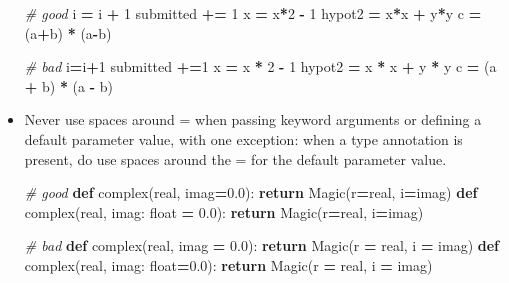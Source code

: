 \documentclass[
]{book}
\newenvironment{Shaded}{\begin{snugshade}}{\end{snugshade}}
\newcommand{\BuiltInTok}[1]{#1}
\newcommand{\CommentTok}[1]{\textcolor[rgb]{0.56,0.35,0.01}{\textit{#1}}}
\newcommand{\ControlFlowTok}[1]{\textcolor[rgb]{0.13,0.29,0.53}{\textbf{#1}}}
\newcommand{\DecValTok}[1]{\textcolor[rgb]{0.00,0.00,0.81}{#1}}
\newcommand{\FloatTok}[1]{\textcolor[rgb]{0.00,0.00,0.81}{#1}}
\newcommand{\KeywordTok}[1]{\textcolor[rgb]{0.13,0.29,0.53}{\textbf{#1}}}
\newcommand{\NormalTok}[1]{#1}
\newcommand{\OperatorTok}[1]{\textcolor[rgb]{0.81,0.36,0.00}{\textbf{#1}}}
\begin{document}
\begin{itemize}
\begin{Shaded}
\begin{Highlighting}[]
\CommentTok{# good}
\NormalTok{i }\OperatorTok{=}\NormalTok{ i }\OperatorTok{+} \DecValTok{1}
\NormalTok{submitted }\OperatorTok{+=} \DecValTok{1}
\NormalTok{x }\OperatorTok{=}\NormalTok{ x}\OperatorTok{*}\DecValTok{2} \OperatorTok{-} \DecValTok{1}
\NormalTok{hypot2 }\OperatorTok{=}\NormalTok{ x}\OperatorTok{*}\NormalTok{x }\OperatorTok{+}\NormalTok{ y}\OperatorTok{*}\NormalTok{y}
\NormalTok{c }\OperatorTok{=}\NormalTok{ (a}\OperatorTok{+}\NormalTok{b) }\OperatorTok{*}\NormalTok{ (a}\OperatorTok{-}\NormalTok{b)}

\CommentTok{# bad}
\NormalTok{i}\OperatorTok{=}\NormalTok{i}\OperatorTok{+}\DecValTok{1}
\NormalTok{submitted }\OperatorTok{+=}\DecValTok{1}
\NormalTok{x }\OperatorTok{=}\NormalTok{ x }\OperatorTok{*} \DecValTok{2} \OperatorTok{-} \DecValTok{1}
\NormalTok{hypot2 }\OperatorTok{=}\NormalTok{ x }\OperatorTok{*}\NormalTok{ x }\OperatorTok{+}\NormalTok{ y }\OperatorTok{*}\NormalTok{ y}
\NormalTok{c }\OperatorTok{=}\NormalTok{ (a }\OperatorTok{+}\NormalTok{ b) }\OperatorTok{*}\NormalTok{ (a }\OperatorTok{-}\NormalTok{ b)}
\end{Highlighting}
\end{Shaded}
\item
  Never use spaces around = when passing keyword arguments or defining a default
  parameter value, with one exception: when a type annotation is present, do
  use spaces around the = for the default parameter value.

\begin{Shaded}
\begin{Highlighting}[]
\CommentTok{# good}
\KeywordTok{def} \BuiltInTok{complex}\NormalTok{(real, imag}\OperatorTok{=}\FloatTok{0.0}\NormalTok{): }\ControlFlowTok{return}\NormalTok{ Magic(r}\OperatorTok{=}\NormalTok{real, i}\OperatorTok{=}\NormalTok{imag)}
\KeywordTok{def} \BuiltInTok{complex}\NormalTok{(real, imag: }\BuiltInTok{float} \OperatorTok{=} \FloatTok{0.0}\NormalTok{): }\ControlFlowTok{return}\NormalTok{ Magic(r}\OperatorTok{=}\NormalTok{real, i}\OperatorTok{=}\NormalTok{imag)}

\CommentTok{# bad}
\KeywordTok{def} \BuiltInTok{complex}\NormalTok{(real, imag }\OperatorTok{=} \FloatTok{0.0}\NormalTok{): }\ControlFlowTok{return}\NormalTok{ Magic(r }\OperatorTok{=}\NormalTok{ real, i }\OperatorTok{=}\NormalTok{ imag)}
\KeywordTok{def} \BuiltInTok{complex}\NormalTok{(real, imag: }\BuiltInTok{float}\OperatorTok{=}\FloatTok{0.0}\NormalTok{): }\ControlFlowTok{return}\NormalTok{ Magic(r }\OperatorTok{=}\NormalTok{ real, i }\OperatorTok{=}\NormalTok{ imag)}
\end{Highlighting}
\end{Shaded}
\end{itemize}
\end{document}
